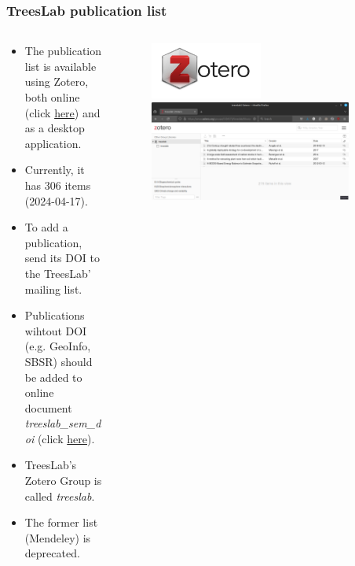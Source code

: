\documentclass[aspectratio=169]{beamer}
\begin{document}
\begin{frame}
	\frametitle{TreesLab publication list}
	\begin{columns}
		\begin{column}{0.5\textwidth}
            \begin{itemize}
                \item The publication list is available using Zotero, both 
                    online (click
                  \href{https://www.zotero.org/groups/5304570/treeslab/library}
                    {here}) and as a desktop application.
                \item Currently, it has 306 items (2024-04-17).
                \item To add a publication, send its DOI to the TreesLab' 
                    mailing list.
                \item Publications wihtout DOI (e.g. GeoInfo, SBSR) should be
                    added to online document \emph{treeslab\_sem\_doi} (click 
\href{https://docs.google.com/document/d/1pnIX_u3Si7J9OBJ1drsbBws5Fgrju_gM4Iyv_DvEw7g/edit?usp=sharing}
                    {here}).
                \item TreesLab's Zotero Group is called \emph{treeslab}.
                \item The former list (Mendeley) is deprecated.
            \end{itemize}
		\end{column}
		\begin{column}{0.5\textwidth}
			\begin{figure}
				\centering
				\includegraphics[width=0.5\textwidth]{logos/zotero.jpg}
                \includegraphics[width=0.9\textwidth]{img/zotero_treeslab.png}
			\end{figure}
		\end{column}
	\end{columns}
\end{frame}
\end{document}
